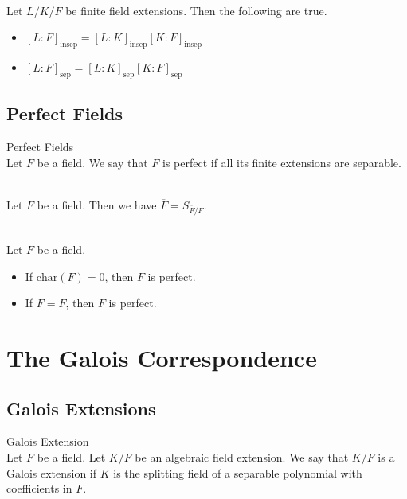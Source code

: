 \documentclass[a4paper]{article}
\begin{document}
\begin{lmm}{}{}\\
Let $L/K/F$ be finite field extensions. Then the following are true. 
\begin{itemize}
\item $[L:F]_{\text{insep}}=[L:K]_{\text{insep}}[K:F]_{\text{insep}}$
\item $[L:F]_{\text{sep}}=[L:K]_{\text{sep}}[K:F]_{\text{sep}}$
\end{itemize}
\end{lmm}

\subsection{Perfect Fields}
\begin{defn}{Perfect Fields}{}\\
Let $F$ be a field. We say that $F$ is perfect if all its finite extensions are separable. 
\end{defn}

\begin{lmm}{}{}\\
Let $F$ be a field. Then we have $\overline{F}=S_{\overline{F}/F}$. 
\end{lmm}

\begin{eg}{}{}\\
Let $F$ be a field. 
\begin{itemize}
\item If $\text{char}(F)=0$, then $F$ is perfect. 
\item If $\overline{F}=F$, then $F$ is perfect. 
\end{itemize}
\end{eg}

\pagebreak
\section{The Galois Correspondence}
\subsection{Galois Extensions}
\begin{defn}{Galois Extension}{}\\
Let $F$ be a field. Let $K/F$ be an algebraic field extension. We say that $K/F$ is a Galois extension if $K$ is the splitting field of a separable polynomial with coefficients in $F$. 
\end{defn}
\end{document}
